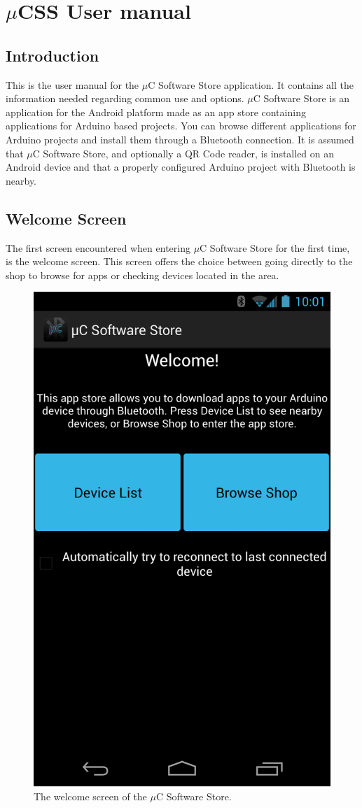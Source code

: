 \chapter{$\mu$CSS User manual}\label{user-manual}
	\section{Introduction}
		This is the user manual for the $\mu$C Software Store application. It contains all the information needed regarding common use and options. $\mu$C Software Store is an application for the Android platform made as an app store containing applications for Arduino based projects. You can browse different applications for Arduino projects and install them through a Bluetooth connection. It is assumed that $\mu$C Software Store, and optionally a QR Code reader, is installed on an Android device and that a properly configured Arduino project with Bluetooth is nearby.\\
		\newpage
	\section{Welcome Screen}
		The first screen encountered when entering $\mu$C Software Store for the first time, is the welcome screen. This screen offers the choice between going directly to the shop to browse for apps or checking devices located in the area. \\
		\newline
		\begin{figure}[H]
			\centering
			\includegraphics[width=0.5 \textwidth]{images/Screenshots/welcome_screen.png}
			\caption{The welcome screen of the $\mu$C Software Store.}
		\end{figure}

